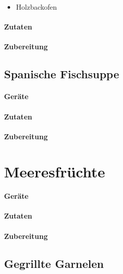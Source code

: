 \begin{itemize}[noitemsep]
	\item Holzbackofen
\end{itemize}

\paragraph{Zutaten}

\paragraph{Zubereitung}

\subsection{Spanische Fischsuppe}

\paragraph{Geräte}

\paragraph{Zutaten}

\paragraph{Zubereitung}

\section{Meeresfrüchte}

\paragraph{Geräte}

\paragraph{Zutaten}

\paragraph{Zubereitung}


\subsection{Gegrillte Garnelen}

